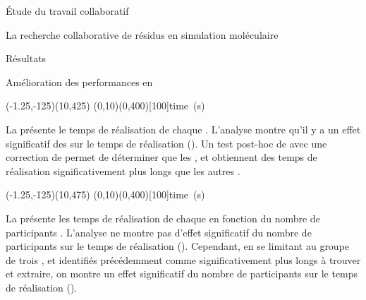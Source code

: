 \documentclass[myfrancais]{mythesis}
\begin{document}
\begin{mypart}{Étude du travail collaboratif}
\begin{mychapter}{La recherche collaborative de résidus en simulation moléculaire}
\begin{mysection}{Résultats}
\begin{mysubsection}{Amélioration des performances en }
\begin{myfigure}
						\begin{myps}(-1.25,-125)(10,425)
							\myaxes(0,10){}(0,400)[100]{time~(s)}
						\end{myps}
					\end{myfigure}

					La  présente le temps de réalisation  de chaque  .
					L'analyse montre qu'il y a un effet significatif des   sur le temps de réalisation  ().
					Un test post-hoc de  avec une correction de  permet de déterminer que les  ,  et  obtiennent des temps de réalisation significativement plus longs que les autres .

					\begin{myfigure}
						\begin{myps}(-1.25,-125)(10,475)
							\myaxes(0,10){}(0,400)[100]{time~(s)}
						\end{myps}
					\end{myfigure}

					La  présente les temps de réalisation  de chaque   en fonction du nombre de participants .
					L'analyse ne montre pas d'effet significatif du nombre de participants  sur le temps de réalisation  ().
					Cependant, en se limitant au groupe de trois  ,  et  identifiés précédemment comme significativement plus longs à trouver et extraire, on montre un effet significatif du nombre de participants  sur le temps de réalisation  ().


\end{mysubsection}
\end{mysection}
\end{mychapter}
\end{mypart}
\end{document}

